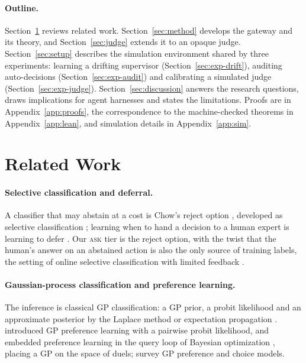 \documentclass[11pt]{article}
\begin{document}
\paragraph{Outline.} Section~\ref{sec:related} reviews related work.
Section~\ref{sec:method} develops the gateway and its theory, and
Section~\ref{sec:judge} extends it to an opaque judge.
Section~\ref{sec:setup} describes the simulation environment shared by three
experiments: learning a drifting supervisor (Section~\ref{sec:exp-drift}),
auditing auto-decisions (Section~\ref{sec:exp-audit}) and calibrating a
simulated judge (Section~\ref{sec:exp-judge}). Section~\ref{sec:discussion}
answers the research questions, draws implications for agent harnesses and
states the limitations. Proofs are in Appendix~\ref{app:proofs}, the
correspondence to the machine-checked theorems in Appendix~\ref{app:lean},
and simulation details in Appendix~\ref{app:sim}.

\section{Related Work}\label{sec:related}

\paragraph{Selective classification and deferral.} A classifier that may
abstain at a cost is Chow's reject option \citep{chow1970optimum}, developed
as selective classification \citep{elyaniv2010foundations,geifman2017selective};
learning when to hand a decision to a human expert is learning to defer
\citep{madras2018predict,mozannar2020consistent}. Our \textsc{ask} tier is the
reject option, with the twist that the human's answer on an abstained action
is also the only source of training labels, the setting of online selective
classification with limited feedback \citep{gangrade2021online}.

\paragraph{Gaussian-process classification and preference learning.} The
inference is classical GP classification: a GP prior, a probit likelihood and
an approximate posterior by the Laplace method or expectation propagation
\citep{rasmussen2006gaussian,minka2001ep}. \citet{chu2005preference}
introduced GP preference learning with a pairwise probit likelihood, and
\citet{gonzalez2017preferential} embedded preference learning in the query loop
of Bayesian optimization \citep{brochu2010tutorial,shahriari2016bayesopt},
placing a GP on the space of duels; \citet{benavoli2026tutorial} survey GP
preference and choice models.
\end{document}
